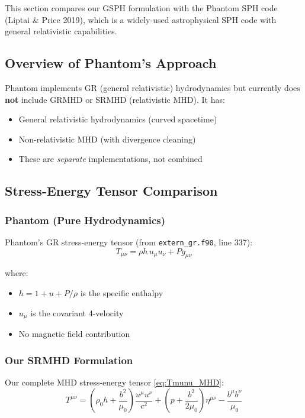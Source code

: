 \documentclass[12pt,a4paper]{article}
\begin{document}
This section compares our GSPH formulation with the Phantom SPH code
(Liptai \& Price 2019), which is a widely-used astrophysical SPH code with
general relativistic capabilities.

\subsection{Overview of Phantom's Approach}

Phantom implements GR (general relativistic) hydrodynamics but currently does
\textbf{not} include GRMHD or SRMHD (relativistic MHD). It has:
\begin{itemize}
    \item General relativistic hydrodynamics (curved spacetime)
    \item Non-relativistic MHD (with divergence cleaning)
    \item These are \textit{separate} implementations, not combined
\end{itemize}

\subsection{Stress-Energy Tensor Comparison}

\subsubsection{Phantom (Pure Hydrodynamics)}

Phantom's GR stress-energy tensor (from \texttt{extern\_gr.f90}, line 337):
\begin{equation}
T_{\mu\nu} = \rho h \, u_\mu u_\nu + P g_{\mu\nu}
\label{eq:phantom_tmunu}
\end{equation}

where:
\begin{itemize}
    \item $h = 1 + u + P/\rho$ is the specific enthalpy
    \item $u_\mu$ is the covariant 4-velocity
    \item No magnetic field contribution
\end{itemize}

\subsubsection{Our SRMHD Formulation}

Our complete MHD stress-energy tensor \eqref{eq:Tmunu_MHD}:
\begin{equation}
T^{\mu\nu} = \left(\rho_0 h + \frac{b^2}{\mu_0}\right)\frac{u^\mu u^\nu}{c^2}
+ \left(p + \frac{b^2}{2\mu_0}\right)\eta^{\mu\nu}
- \frac{b^\mu b^\nu}{\mu_0}
\end{equation}
\end{document}
